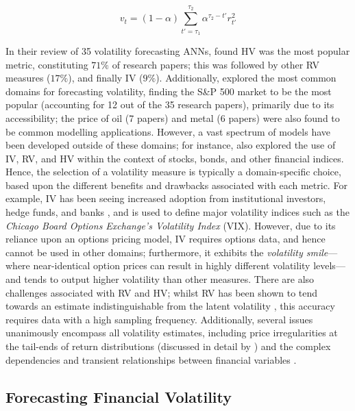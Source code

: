 \documentclass[a4paper, 11pt]{report}
\begin{document}
    \begin{equation}
        \label{eq: hv2}
        v_t = (1 - \alpha) \sum_{t' = \tau_1}^{\tau_2} \alpha^{\tau_2 - t'} r_{t'}^2
    \end{equation}

    In their review of 35 volatility forecasting ANNs, \citet{ge-2022} found HV was the most popular metric, constituting $71\%$ of research papers; this was followed by other RV measures ($17\%$), and finally IV ($9\%$). Additionally, \citet{ge-2022} explored the most common domains for forecasting volatility, finding the S\&P 500 market to be the most popular (accounting for 12 out of the 35 research papers), primarily due to its accessibility; the price of oil (7 papers) and metal (6 papers) were also found to be common modelling applications. However, a vast spectrum of models have been developed outside of these domains; for instance, \citet{ge-2022} also explored the use of IV, RV, and HV within the context of stocks, bonds, and other financial indices. Hence, the selection of a volatility measure is typically a domain-specific choice, based upon the different benefits and drawbacks associated with each metric. For example, IV has been seeing increased adoption from institutional investors, hedge funds, and banks \citep{neftci-2008}, and is used to define major volatility indices such as the \emph{Chicago Board Options Exchange's Volatility Index} (VIX). However, due to its reliance upon an options pricing model, IV requires options data, and hence cannot be used in other domains; furthermore, it exhibits the \emph{volatility smile}---where near-identical option prices can result in highly different volatility levels---and tends to output higher volatility than other measures. There are also challenges associated with RV and HV; whilst RV has been shown to tend towards an estimate indistinguishable from the latent volatility \citep{andersen-2001}, this accuracy requires data with a high sampling frequency. Additionally, several issues unanimously encompass all volatility estimates, including price irregularities at the tail-ends of return distributions (discussed in detail by \citet{ozbayoglu-2020}) and the complex dependencies and transient relationships between financial variables \citep{timmermann-2004}.


    \subsection{Forecasting Financial Volatility}
\end{document}
